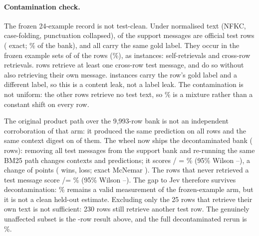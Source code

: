 \paragraph{Contamination check.} The frozen 24-example record is not
test-clean. Under normalised text (NFKC, case-folding, punctuation collapsed),
\ContamSupportMatches{} of the \ContamSupportOriginal{} support messages are
official test rows (\ContamSupportExact{} exact; \ContamSupportShare\% of the
bank), and all \ContamSupportSameLabel{} carry the same gold label. They occur
in the frozen example sets of \ContamEvalRows{} of the \ContamCleanN{} rows
(\ContamEvalShare\%), as \ContamInstances{} instances: \ContamSelf{}
self-retrievals and \ContamCross{} cross-row retrievals. \ContamCrossRows{}
rows retrieve at least one cross-row test message, and \ContamCrossOnlyRows{} do so
without also retrieving their own message. \ContamSameLabel{} instances carry
the row's gold label and \ContamDiffLabel{} a different label, so this is a
content leak, not a label leak. The contamination is not uniform: the other
\ContamUnaffectedN{} rows retrieve no test text, so \QueryPctQueryTwo\% is a
mixture rather than a constant shift on every row.

The original product path over the 9{,}993-row bank is not an independent
corroboration of that arm: it produced the same prediction on all
\ContamCleanN{} rows and the same context digest on
\ContamProductFrozenSameContext{} of them. The wheel now ships the decontaminated
bank (\ContamSupportClean{} rows): removing all \ContamSupportMatches{} test
messages from the support bank and re-running the same BM25 path changes
\ContamCleanContextChanged{} contexts and \ContamCleanPredSame{} predictions; it
scores \ContamCleanCorrect/\ContamCleanN
= \ContamCleanAcc\% (95\% Wilson \ContamCleanLo--\ContamCleanHi), a change of
\ContamCleanDiff{} points (\ContamCleanWins{} wins, \ContamCleanLosses{} loss;
exact McNemar \ContamCleanPText). The \ContamUnaffectedN{} rows that never
retrieved a test message score \ContamUnaffectedCorrect/\ContamUnaffectedN =
\ContamUnaffectedAcc\% (95\% Wilson \ContamUnaffectedLo--\ContamUnaffectedHi).
The gap to Jev therefore survives decontamination: \QueryPctQueryTwo\% remains a
valid measurement of the frozen-example arm, but it is not a clean held-out
estimate. Excluding only the 25 rows that retrieve their own text is not
sufficient: 230 rows still retrieve another test row. The genuinely unaffected
subset is the \ContamUnaffectedN-row result above, and the full decontaminated
rerun is \ContamCleanAcc\%.

